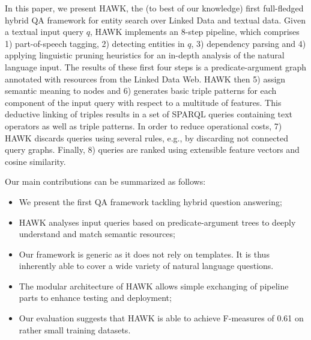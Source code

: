 In this paper, we present HAWK, the (to best of our knowledge) first full-fledged hybrid QA framework for entity search over Linked Data and textual data. 
Given a textual input query $q$, HAWK implements an 8-step pipeline, which comprises 1) part-of-speech tagging, 2) detecting entities in $q$, 3) dependency parsing and 4) applying linguistic pruning heuristics for an in-depth analysis of the natural language input. 
The results of these first four steps is a predicate-argument graph annotated with resources from the Linked Data Web. HAWK then 5) assign semantic meaning to nodes and 6) generates basic triple patterns for each component of the input query with respect to a multitude of features. 
This deductive linking of triples results in a set of SPARQL queries containing text operators as well as triple patterns.
In order to reduce operational costs, 7) HAWK discards queries using several rules, e.g., by  discarding not connected query graphs.
Finally, 8) queries are ranked using extensible feature vectors and cosine similarity.


Our main contributions can be summarized as follows:
 \begin{itemize}
 \item We present the first QA framework tackling hybrid question answering;
 \item HAWK analyses input queries based on predicate-argument trees to deeply understand and match semantic resources;
 \item Our framework is generic as it does not rely on templates. It is thus inherently able to cover a wide variety of natural language questions. %
 \item The modular architecture of HAWK allows simple exchanging of pipeline parts to enhance testing and deployment;
 \item Our evaluation suggests that HAWK is able to achieve F-measures of 0.61 on rather small training datasets.
 \end{itemize}

